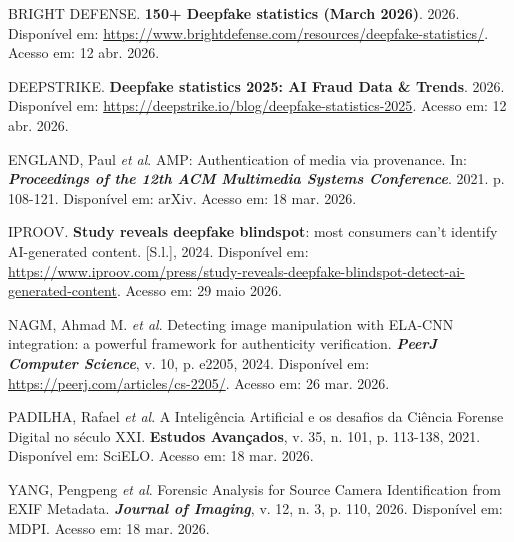 \newpage
{}
\singlespacing
\begin{flushleft}
BRIGHT DEFENSE. \textbf{150+ Deepfake statistics (March 2026)}. 2026. Disponível
em: \url{https://www.brightdefense.com/resources/deepfake-statistics/}. Acesso
em: 12 abr. 2026.

\vspace{4mm}
DEEPSTRIKE. \textbf{Deepfake statistics 2025: AI Fraud Data \& Trends}. 2026.
Disponível em: \url{https://deepstrike.io/blog/deepfake-statistics-2025}. Acesso
em: 12 abr. 2026.

\vspace{4mm}
ENGLAND, Paul \textit{et al}. AMP: Authentication of media via provenance. In:
\textbf{\textit{Proceedings of the 12th ACM Multimedia Systems Conference}}.
2021. p. 108-121. Disponível em: arXiv. Acesso em: 18 mar. 2026.

\vspace{4mm}
IPROOV. \textbf{Study reveals deepfake blindspot}: most consumers can't identify
AI-generated content. [S.l.], 2024. Disponível em:
\url{https://www.iproov.com/press/study-reveals-deepfake-blindspot-detect-ai-generated-content}.
Acesso em: 29 maio 2026.

\vspace{4mm}
NAGM, Ahmad M. \textit{et al}. Detecting image manipulation with ELA-CNN
integration: a powerful framework for authenticity verification.
\textbf{\textit{PeerJ Computer Science}}, v. 10, p. e2205, 2024. Disponível em:
\url{https://peerj.com/articles/cs-2205/}. Acesso em: 26 mar. 2026.

\vspace{4mm}
PADILHA, Rafael \textit{et al}. A Inteligência Artificial e os desafios da Ciência
Forense Digital no século XXI. \textbf{Estudos Avançados}, v. 35, n. 101,
p. 113-138, 2021. Disponível em: SciELO. Acesso em: 18 mar. 2026.

\vspace{4mm}
YANG, Pengpeng \textit{et al}. Forensic Analysis for Source Camera Identification
from EXIF Metadata. \textbf{\textit{Journal of Imaging}}, v. 12, n. 3, p. 110,
2026. Disponível em: MDPI. Acesso em: 18 mar. 2026.
\end{flushleft}
\onehalfspacing

